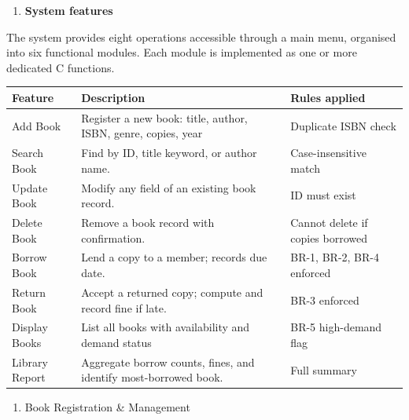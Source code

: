 \documentclass[
]{article}
\newcounter{none} %
\begin{document}
\begin{enumerate}
\def\labelenumi{\arabic{enumi}.}
\setcounter{enumi}{2}
\item
  \textbf{System features}
\end{enumerate}

The system provides eight operations accessible through a main menu,
organised into six functional modules. Each module is implemented as one
or more dedicated C functions.

{\def\LTcaptype{none} %
\begin{longtable}[]{@{}
  >{\raggedright\arraybackslash}p{}
  >{\raggedright\arraybackslash}p{}
  >{\raggedright\arraybackslash}p{}@{}}
\toprule\noalign{}
\begin{minipage}[b]{\linewidth}\raggedright
Feature
\end{minipage} & \begin{minipage}[b]{\linewidth}\raggedright
Description
\end{minipage} & \begin{minipage}[b]{\linewidth}\raggedright
Rules applied
\end{minipage} \\
\midrule\noalign{}
\endhead
\bottomrule\noalign{}
\endlastfoot
Add Book & Register a new book: title, author, ISBN, genre, copies, year
& Duplicate ISBN check \\
Search Book & Find by ID, title keyword, or author name. &
Case-insensitive match \\
Update Book & Modify any field of an existing book record. & ID must
exist \\
Delete Book & Remove a book record with confirmation. & Cannot delete if
copies borrowed \\
Borrow Book & Lend a copy to a member; records due date. & BR-1, BR-2,
BR-4 enforced \\
Return Book & Accept a returned copy; compute and record fine if late. &
BR-3 enforced \\
Display Books & List all books with availability and demand status &
BR-5 high-demand flag \\
Library Report & Aggregate borrow counts, fines, and identify
most-borrowed book. & Full summary \\
\end{longtable}
}

\begin{enumerate}
\def\labelenumi{\alph{enumi})}
\item
  Book Registration \& Management
\end{enumerate}
\end{document}
